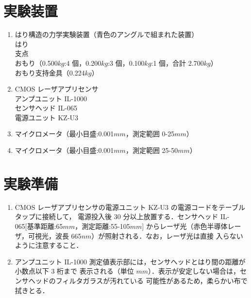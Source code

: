 \documentclass[a4paper,11pt]{jsarticle}
\begin{document}
\section{実験装置}
\begin{enumerate}
  \item はり構造の力学実験装置（青色のアングルで組まれた装置）\\
  はり\\
  支点\\
  おもり（0.500$kg$:4 個，0.200$kg$:3 個，0.100$kg$:1 個，合計 2.700$kg$）\\
  おもり支持金具（0.224$kg$）
  \item CMOS レーザアプリセンサ\\
  アンプユニット IL-1000\\
  センサヘッド IL-065\\
  電源ユニット KZ-U3
  \item マイクロメータ（最小目盛:0.001$mm$，測定範囲 0-25$mm$）
  \item マイクロメータ（最小目盛:0.001$mm$，測定範囲 25-50$mm$）
\end{enumerate}

\section{実験準備}
\begin{enumerate}
  \item CMOS レーザアプリセンサの電源ユニット KZ-U3 の電源コードをテーブルタップに接続して，
  電源投入後 30 分以上放置する．センサヘッド IL-065[基準距離:65$mm$，測定距離:55-105$mm$]
  からレーザ光（赤色半導体レーザ，可視光，波長 665$nm$）が照射される．なお，レーザ光は直接
  入らないように注意すること．
  \item アンプユニット IL-1000 測定値表示部には，センサヘッドとはり間の距離が小数点以下 3 桁まで
  表示される（単位 $mm$）．表示が安定しない場合は，センサヘッドのフィルタガラスが汚れている
  可能性があるため，柔らかい布で拭きとる．
\end{enumerate}
\end{document}
